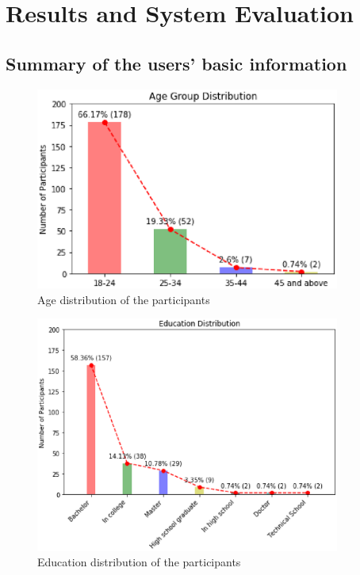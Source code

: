 \chapter{Results and System Evaluation}

\section{Summary of the users' basic information}

\begin{figure}[tbp]
 \begin{center}
  \includegraphics[width=100mm]{age_distribution.eps}
 \end{center}
 \caption{\label{figure:age_distribution} Age distribution of the participants}
\end{figure}

\begin{figure}[tbp]
 \begin{center}
  \includegraphics[width=100mm]{education_distribution.eps}
 \end{center}
 \caption{\label{figure:education_distribution} Education distribution of the participants}
\end{figure}

